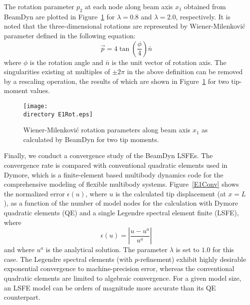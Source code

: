 The rotation parameter $p_2$ at each node along beam axis $x_1$ obtained from BeamDyn are plotted in Figure~\ref{E1Rot} for $\lambda = 0.8$ and $\lambda = 2.0$, respectively. It is noted that the three-dimensional rotations are represented by Wiener-Milenkovi\'c parameter defined in the following equation:
 \begin{equation}
     \vec{p} = 4 \tan\left(\frac{\phi}{4} \right) \bar{n} 
     \label{WMParameter}
 \end{equation}
where $\phi$ is the rotation angle and $\bar{n}$ is the unit vector of
rotation axis. The singularities existing at multiples of $\pm 2 \pi$ in the
above definition can be removed by a rescaling operation, the results of
which are shown in Figure~\ref{E1Rot} for two tip-moment values.

\begin{figure}
    \centering
    \texttt{[image: \\directory E1Rot.eps]}
    \caption{Wiener-Milenkovi\'c rotation parameters along beam axis $x_1$
as calculated by BeamDyn for two tip moments. }
    \label{E1Rot}
\end{figure}

Finally, we conduct a convergence study of the BeamDyn LSFEs. The
convergence rate is compared with conventional quadratic elements used in
Dymore, which is a finite-element
based multibody dynamics code for the comprehensive modeling of flexible
multibody systems. 
Figure~\ref{E1Conv} shows the normalized error
$\epsilon(u)$, where $u$ is the calculated tip displacement (at $x=L$), as a function
of the number of model nodes for the calculation with Dymore quadratic
elements (QE) and a single Legendre spectral element finite (LSFE), where
\begin{equation}
    \label{E1Error}
    \epsilon(u) = \left| \frac{u-u^a}{u^a} \right|
\end{equation}
and where $u^a$ is the analytical solution.  The parameter $\lambda$ is set
to $1.0$ for this case. The Legendre spectral elements (with $p$-refinement)
exhibit highly desirable exponential convergence to machine-precision error,
whereas the conventional quadratic elements are limited to algebraic
convergence.    For a given model size, an LSFE model can be orders of magnitude
more accurate than its QE counterpart.


